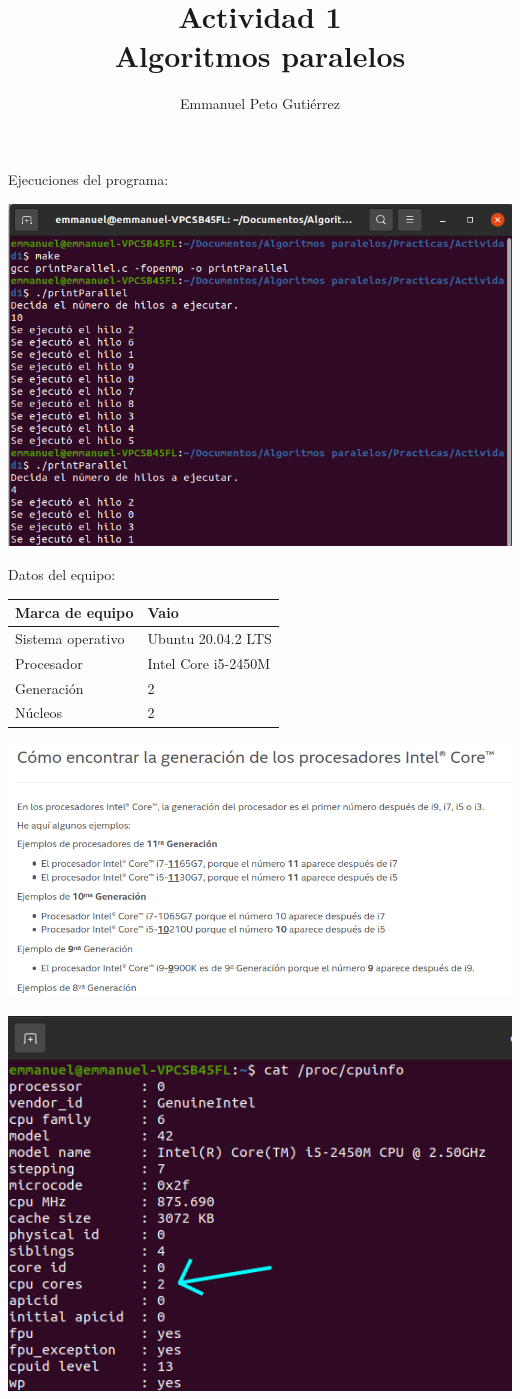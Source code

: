 \documentclass{article}
\title{Actividad 1\\Algoritmos paralelos}
\author{Emmanuel Peto Gutiérrez}
\begin{document}
\maketitle

Ejecuciones del programa:

\includegraphics[width=\linewidth]{1}

Datos del equipo:

\begin{center}
\begin{tabular}{|l|l|}
\hline
Marca de equipo & Vaio \\ \hline
Sistema operativo & Ubuntu 20.04.2 LTS \\ \hline
Procesador & Intel Core i5-2450M \\ \hline
Generación & 2 \\ \hline
Núcleos & 2 \\ \hline
\end{tabular}
\end{center}

\includegraphics[width=\linewidth]{2}

\includegraphics[width=\linewidth]{3}
\end{document}
